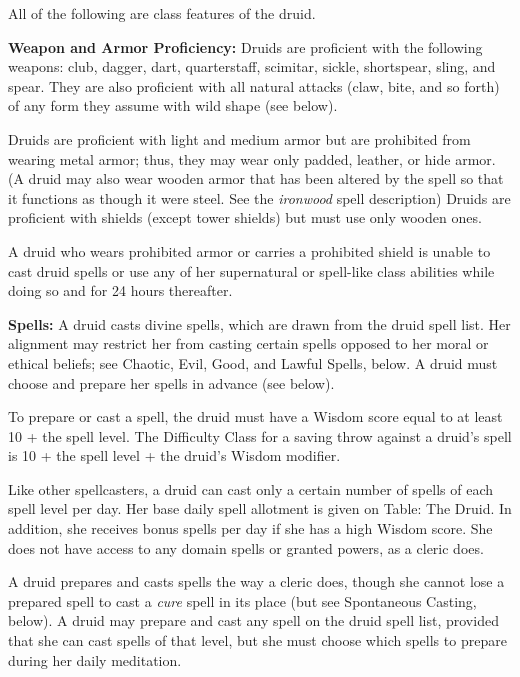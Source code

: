 \ClassFeatures

All of the following are class features of the druid.

\textbf{Weapon and Armor Proficiency:} Druids are proficient with the following 
weapons: club, dagger, dart, quarterstaff, scimitar, sickle, shortspear, sling, 
and spear. They are also proficient with all natural attacks (claw, bite, and so 
forth) of any form they assume with wild shape (see below).

Druids are proficient with light and medium armor but are prohibited from wearing 
metal armor; thus, they may wear only padded, leather, or hide armor. (A druid 
may also wear wooden armor that has been altered by the  spell 
so that it functions as though it were steel. See the \textit{ironwood} spell description) 
Druids are proficient with shields (except tower shields) but must use only wooden 
ones.

A druid who wears prohibited armor or carries a prohibited shield is unable to 
cast druid spells or use any of her supernatural or spell-like class abilities 
while doing so and for 24 hours thereafter.

\textbf{Spells:} A druid casts divine spells, which are drawn from the druid spell 
list. Her alignment may restrict her from casting certain spells opposed to her 
moral or ethical beliefs; see Chaotic, Evil, Good, and Lawful Spells, below. A 
druid must choose and prepare her spells in advance (see below).

To prepare or cast a spell, the druid must have a Wisdom score equal to at least 
10 + the spell level. The Difficulty Class for a saving throw against a druid's 
spell is 10 + the spell level + the druid's Wisdom modifier.

Like other spellcasters, a druid can cast only a certain number of spells of each 
spell level per day. Her base daily spell allotment is given on Table: The Druid. 
In addition, she receives bonus spells per day if she has a high Wisdom score. 
She does not have access to any domain spells or granted powers, as a cleric does.

A druid prepares and casts spells the way a cleric does, though she cannot lose 
a prepared spell to cast a \textit{cure} spell in its place (but see Spontaneous 
Casting, below). A druid may prepare and cast any spell on the druid spell list, 
provided that she can cast spells of that level, but she must choose which spells 
to prepare during her daily meditation.

